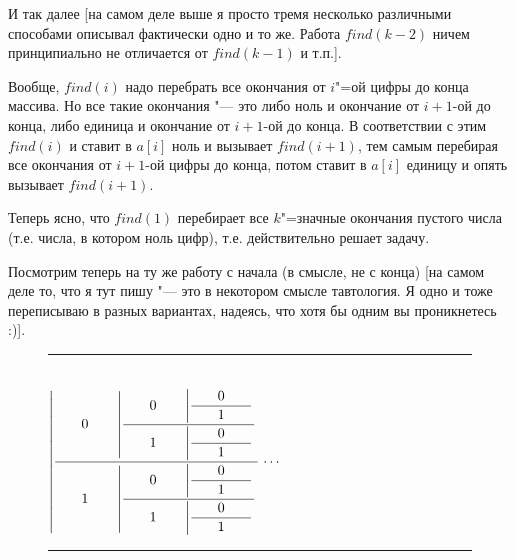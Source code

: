 И так далее [на самом деле выше я просто тремя несколько различными способами
описывал фактически одно и то же. Работа $find(k-2)$ ничем принципиально не 
отличается от $find(k-1)$ и т.п.].

Вообще, $find(i)$ надо перебрать все окончания от $i$"=ой цифры до конца массива. Но все 
такие окончания "--- это либо ноль и окончание от $i+1$-ой до конца, либо единица 
и окончание от $i+1$-ой до конца. В соответствии с этим $find(i)$ и ставит в $a[i]$ 
ноль и вызывает $find(i+1)$, тем самым перебирая все окончания от $i+1$-ой цифры до 
конца, потом ставит в $a[i]$ единицу и опять вызывает $find(i+1)$.

Теперь ясно, что $find(1)$ перебирает все $k$"=значные окончания пустого числа (т.е. 
числа, в котором ноль цифр), т.е. действительно решает задачу.

Посмотрим теперь на ту же работу с начала (в смысле, не с конца) [на самом деле 
то, что я тут пишу "--- это в некотором смысле тавтология. Я одно и тоже 
переписываю в разных вариантах, надеясь, что хотя бы одним вы проникнетесь :)]. 

\begin{wrapfigure}{l}{6.5cm}
{\newcommand{\0}{\hbox to 1.5cm{\hfill 0\hfill}}
\newcommand{\1}{\hbox to 1.5cm{\hfill 1\hfill}}
\rule{6cm}{0.5pt}\\
 $
\displaystyle
\left|
\frac{\displaystyle
\0
  \left|
  \frac{\displaystyle
  \0
    \left|
    \frac{\displaystyle
    \0
    }{\displaystyle
    \1
    }
    \right.
  }{\displaystyle
  \1
    \left|
    \frac{\displaystyle
    \0
    }{\displaystyle
    \1
    }
    \right.
  }
  \right.
}{\displaystyle
\1
  \left|
  \frac{\displaystyle
  \0
    \left|
    \frac{\displaystyle
    \0
    }{\displaystyle
    \1
    }
    \right.
  }{\displaystyle
  \1
    \left|
    \frac{\displaystyle
    \0
    }{\displaystyle
    \1
    }
    \right.
  }
  \right.
}
\right.
\cdots
 $\\
\rule{6cm}{0.5pt}
}
\end{wrapfigure}


